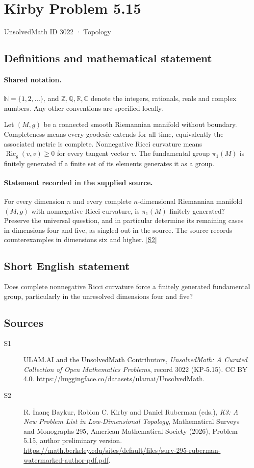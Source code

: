 \documentclass[11pt]{article}
\newcommand{\sref}[2]{\hyperlink{source:#1:#2}{[S#2]}}
\begin{document}
\setcounter{section}{3021}
\section{Kirby Problem 5.15}\label{3022}
{\small\sffamily UnsolvedMath ID 3022 · Topology}
\subsection{Definitions and mathematical statement}

\paragraph{Shared notation.}$\mathbb N=\{1,2,\ldots\}$, and $\mathbb Z,\mathbb Q,\mathbb R,\mathbb C$ denote the integers, rationals, reals and complex numbers. Any other conventions are specified locally.


Let $(M,g)$ be a connected smooth Riemannian manifold without boundary. Completeness means every geodesic extends for all time, equivalently the associated metric is complete. Nonnegative Ricci curvature means $\operatorname{Ric}_g(v,v)\geq0$ for every tangent vector $v$. The fundamental group $\pi_1(M)$ is finitely generated if a finite set of its elements generates it as a group.
\paragraph{Statement recorded in the supplied source.}
For every dimension $n$ and every complete $n$-dimensional Riemannian manifold $(M,g)$ with nonnegative Ricci curvature, is $\pi_1(M)$ finitely generated? Preserve the universal question, and in particular determine its remaining cases in dimensions four and five, as singled out in the source. The source records counterexamples in dimensions six and higher. \sref{3022}{2}
\subsection{Short English statement}
Does complete nonnegative Ricci curvature force a finitely generated fundamental group, particularly in the unresolved dimensions four and five?
\subsection{Sources}
\begin{description}
\item[\hypertarget{source:3022:1}{S1}] ULAM.AI and the UnsolvedMath Contributors, \emph{UnsolvedMath: A Curated Collection of Open Mathematics Problems}, record 3022 (KP-5.15). CC BY 4.0. \url{https://huggingface.co/datasets/ulamai/UnsolvedMath}.
\item[\hypertarget{source:3022:2}{S2}] R. İnanç Baykur, Robion C. Kirby and Daniel Ruberman (eds.), \emph{K3: A New Problem List in Low-Dimensional Topology}, Mathematical Surveys and Monographs 295, American Mathematical Society (2026), Problem 5.15, author preliminary version. \url{https://math.berkeley.edu/sites/default/files/surv-295-ruberman-watermarked-author-pdf.pdf}.
\end{description}
\label{end:3022}
\end{document}

